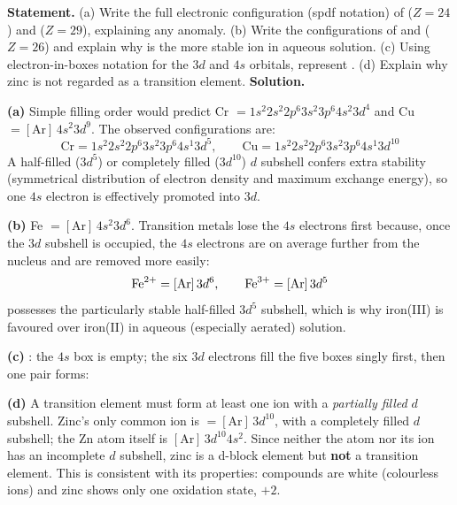 \documentclass[11pt]{article}
\begin{document}
\begin{exoresolu}
\textbf{Statement.} (a) Write the full electronic configuration (spdf notation) of  ($Z=24$) and  ($Z=29$), explaining any anomaly. (b) Write the configurations of  and  ($Z=26$) and explain why  is the more stable ion in aqueous solution. (c) Using electron-in-boxes notation for the $3d$ and $4s$ orbitals, represent . (d) Explain why zinc is not regarded as a transition element.
\tcblower
\textbf{Solution.}

\textbf{(a)} Simple filling order would predict Cr $= 1s^2 2s^2 2p^6 3s^2 3p^6 4s^2 3d^4$ and Cu $= [\mathrm{Ar}]\,4s^2 3d^9$. The observed configurations are:
\[ \text{Cr} = 1s^2 2s^2 2p^6 3s^2 3p^6 4s^1 3d^5, \qquad \text{Cu} = 1s^2 2s^2 2p^6 3s^2 3p^6 4s^1 3d^{10} \]
A half-filled ($3d^5$) or completely filled ($3d^{10}$) $d$ subshell confers extra stability (symmetrical distribution of electron density and maximum exchange energy), so one $4s$ electron is effectively promoted into $3d$.

\textbf{(b)} Fe $= [\mathrm{Ar}]\,4s^2 3d^6$. Transition metals lose the $4s$ electrons first because, once the $3d$ subshell is occupied, the $4s$ electrons are on average further from the nucleus and are removed more easily:
\[ \ce{Fe^2+} = [\mathrm{Ar}]\,3d^6, \qquad \ce{Fe^3+} = [\mathrm{Ar}]\,3d^5 \]
 possesses the particularly stable half-filled $3d^5$ subshell, which is why iron(III) is favoured over iron(II) in aqueous (especially aerated) solution.

\textbf{(c)} : the $4s$ box is empty; the six $3d$ electrons fill the five boxes singly first, then one pair forms:
\begin{center}
\end{center}

\textbf{(d)} A transition element must form at least one ion with a \emph{partially filled} $d$ subshell. Zinc's only common ion is  $= [\mathrm{Ar}]\,3d^{10}$, with a completely filled $d$ subshell; the Zn atom itself is $[\mathrm{Ar}]\,3d^{10}4s^2$. Since neither the atom nor its ion has an incomplete $d$ subshell, zinc is a d-block element but \textbf{not} a transition element. This is consistent with its properties:  compounds are white (colourless ions) and zinc shows only one oxidation state, $+2$.
\end{exoresolu}
\end{document}

